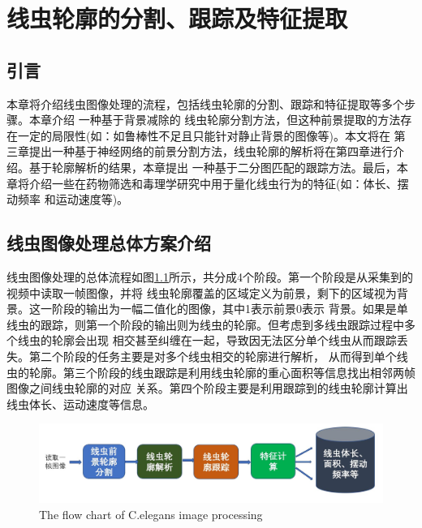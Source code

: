 \chapter{线虫轮廓的分割、跟踪及特征提取}
\section{引言}
	本章将介绍线虫图像处理的流程，包括线虫轮廓的分割、跟踪和特征提取等多个步骤。本章介绍 一种基于背景减除的
	线虫轮廓分割方法，但这种前景提取的方法存在一定的局限性(如：如鲁棒性不足且只能针对静止背景的图像等)。本文将在
	第三章提出一种基于神经网络的前景分割方法，线虫轮廓的解析将在第四章进行介绍。基于轮廓解析的结果，本章提出
	一种基于二分图匹配的跟踪方法。最后，本章将介绍一些在药物筛选和毒理学研究中用于量化线虫行为的特征(如：体长、摆动频率
	和运动速度等)。
\section{线虫图像处理总体方案介绍}
	线虫图像处理的总体流程如图\ref{fig:flow}所示，共分成4个阶段。第一个阶段是从采集到的视频中读取一帧图像，并将
	线虫轮廓覆盖的区域定义为前景，剩下的区域视为背景。这一阶段的输出为一幅二值化的图像，其中1表示前景0表示
	背景。如果是单线虫的跟踪，则第一个阶段的输出则为线虫的轮廓。但考虑到多线虫跟踪过程中多个线虫的轮廓会出现
	相交甚至纠缠在一起，导致因无法区分单个线虫从而跟踪丢失。第二个阶段的任务主要是对多个线虫相交的轮廓进行解析，
	从而得到单个线虫的轮廓。第三个阶段的线虫跟踪是利用线虫轮廓的重心面积等信息找出相邻两帧图像之间线虫轮廓的对应
	关系。第四个阶段主要是利用跟踪到的线虫轮廓计算出线虫体长、运动速度等信息。

		\begin{figure}[h]
	  \centering
	  \includegraphics[width=14cm]{figure/chap3/flow.jpg}
		{The flow chart of C.elegans image processing}
	  \label{fig:flow}
	\end{figure}
